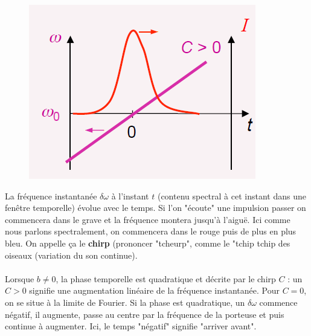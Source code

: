 	\begin{figure}
	\vspace{-10mm}
	\includegraphics[scale=0.4]{ch1/image35}
	\end{figure}
	La fréquence instantanée $\delta \omega$ à l'instant $t$ (contenu spectral à cet instant dans une
	fenêtre temporelle) évolue avec le temps. Si l'on "écoute" une impulsion passer on commencera
	dans le grave et la fréquence montera jusqu'à l'aiguë. Ici comme nous parlons spectralement, 
 	on commencera dans le rouge puis de plus en plus bleu. On appelle ça le \textbf{chirp}
 	(prononcer "tcheurp", comme le "tchip tchip des oiseaux (variation du son continue).\\
 	
 	\ \\
 	 	
 	Lorsque $b\neq0$, la phase temporelle est quadratique et décrite par le chirp $C$ : un $C>0$
 	signifie une augmentation linéaire de la fréquence instantanée. Pour $C=0$, on se situe à la
 	limite de Fourier. Si la phase est quadratique, un $\delta \omega$ commence négatif, il augmente,
 	passe au centre par la fréquence de la porteuse et puis continue à augmenter. Ici, le temps 
 	"négatif" signifie "arriver avant". \\
 	
